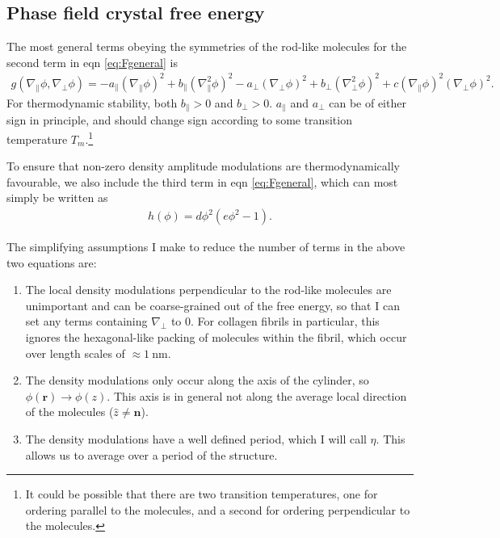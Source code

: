 \documentclass[12pt]{article}
\begin{document}
\subsection{Phase field crystal free energy}
The most general terms obeying the symmetries of the rod-like molecules for the second term in eqn \ref{eq:Fgeneral} is
\begin{align}
g(\nabla_{\parallel}\phi,\nabla_{\bot}\phi)=-a_{\parallel}(\nabla_{\parallel}\phi)^2+b_{\parallel}(\nabla_{\parallel}^2\phi)^2-a_{\bot}(\nabla_{\bot}\phi)^2+b_{\bot}(\nabla_{\bot}^2\phi)^2+c(\nabla_{\parallel}\phi)^2(\nabla_{\bot}\phi)^2.
\end{align}
For thermodynamic stability, both $b_{\parallel}>0$ and $b_{\bot}>0$. $a_{\parallel}$ and $a_{\bot}$ can be of either sign in principle, and should change sign according to some transition temperature $T_m$.\footnote{It could be possible that there are two transition temperatures, one for ordering parallel to the molecules, and a second for ordering perpendicular to the molecules.}

To ensure that non-zero density amplitude modulations are thermodynamically favourable, we also include the third term in eqn \ref{eq:Fgeneral}, which can most simply be written as
\begin{align}
h(\phi)=d\phi^2(e\phi^2-1).
\end{align}

The simplifying assumptions I make to reduce the number of terms in the above two equations are:
\begin{enumerate}[label=2.\alph*]
\item \label{asspfc:1} The local density modulations perpendicular to the rod-like molecules are unimportant and can be coarse-grained out of the free energy, so that I can set any terms containing $\nabla_{\bot}$ to $0$. For collagen fibrils in particular, this ignores the hexagonal-like packing of molecules within the fibril, which occur over length scales of $\approx\SI{1}{\nano\meter}$.
\item \label{asspfc:2} The density modulations only occur along the axis of the cylinder, so $\phi(\bm{r})\to\phi(z)$. This axis is in general not along the average local direction of the molecules ($\hat{z}\neq\bm{n}$).
\item \label{asspfc:3} The density modulations have a well defined period, which I will call $\eta$. This allows us to average over a period of the structure.
\end{enumerate}
\end{document}

